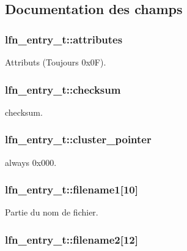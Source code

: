 \subsection{Documentation des champs}
\hypertarget{structlfn__entry__t_a5b1eb8b963f05e47b3d6508b5a986985}{
\subsubsection[{attributes}]{ lfn\-\_\-entry\-\_\-t\-::attributes}}\label{structlfn__entry__t_a5b1eb8b963f05e47b3d6508b5a986985}
Attributs (Toujours 0x0\-F). \hypertarget{structlfn__entry__t_a1a60017a7c8b7502fefc8358a821f0ae}{
\subsubsection[{checksum}]{ lfn\-\_\-entry\-\_\-t\-::checksum}}\label{structlfn__entry__t_a1a60017a7c8b7502fefc8358a821f0ae}
checksum. \hypertarget{structlfn__entry__t_a6f3355b0c241c7a5936c04dccf1614ca}{
\subsubsection[{cluster\-\_\-pointer}]{ lfn\-\_\-entry\-\_\-t\-::cluster\-\_\-pointer}}\label{structlfn__entry__t_a6f3355b0c241c7a5936c04dccf1614ca}
always 0x000. \hypertarget{structlfn__entry__t_a04e5c493f02fa433b7d7d2d489c89e60}{
\subsubsection[{filename1}]{ lfn\-\_\-entry\-\_\-t\-::filename1\mbox{[}10\mbox{]}}}\label{structlfn__entry__t_a04e5c493f02fa433b7d7d2d489c89e60}
Partie du nom de fichier. \hypertarget{structlfn__entry__t_ab88e34e402a566da06c83163e94a1763}{
\subsubsection[{filename2}]{ lfn\-\_\-entry\-\_\-t\-::filename2\mbox{[}12\mbox{]}}}\label{structlfn__entry__t_ab88e34e402a566da06c83163e94a1763}
